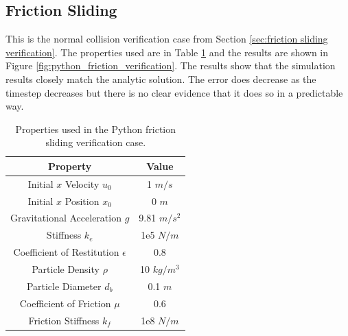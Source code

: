 \documentclass[a4paper,11pt,titlepage]{report}
\begin{document}
\subsection{Friction Sliding}
This is the normal collision verification case from Section \ref{sec:friction sliding verification}. The properties used are in Table \ref{tab:python friction sliding properties} and the results are shown in Figure \ref{fig:python_friction_verification}. The results show that the simulation results closely match the analytic solution. The error does decrease as the timestep decreases but there is no clear evidence that it does so in a predictable way.
\begin{table}[!htb]
\centering
\begin{tabular}{| c c |}
\hline
Property & Value\\
\hline
Initial $x$ Velocity $u_0$ & 1 $m/s$ \\
Initial $x$ Position $x_0$ & 0 $m$ \\
Gravitational Acceleration $g$ & 9.81 $m/s^2$ \\
Stiffness $k_e$ & 1e5 $N/m$ \\
Coefficient of Restitution $\epsilon$ & 0.8 \\
Particle Density $\rho$ & 10 $kg/m^3$ \\
Particle Diameter $d_b$ & 0.1 $m$ \\
Coefficient of Friction $\mu$ & 0.6 \\
Friction Stiffness $k_f$ & 1e8 $N/m$ \\
\hline
\end{tabular}
\caption{Properties used in the Python friction sliding verification case.}
\label{tab:python friction sliding properties}
\end{table}
\end{document}

